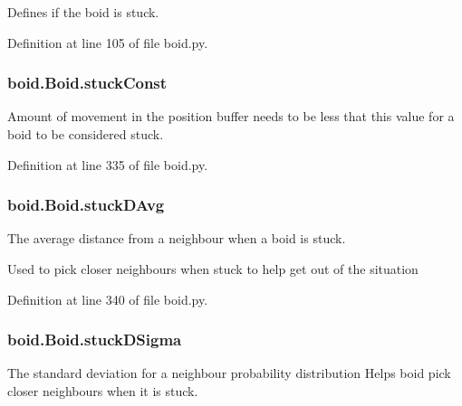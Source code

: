 Defines if the boid is stuck. 



Definition at line 105 of file boid.\-py.

\hypertarget{classboid_1_1Boid_abbcf546137204a45278b6caa95c4378b}{
\subsubsection[{stuck\-Const}]{\setlength{\rightskip}{0pt plus 5cm}boid.\-Boid.\-stuck\-Const}}\label{classboid_1_1Boid_abbcf546137204a45278b6caa95c4378b}


Amount of movement in the position buffer needs to be less that this value for a boid to be considered stuck. 



Definition at line 335 of file boid.\-py.

\hypertarget{classboid_1_1Boid_a663164af1a20323f49e002d7576914f7}{
\subsubsection[{stuck\-D\-Avg}]{\setlength{\rightskip}{0pt plus 5cm}boid.\-Boid.\-stuck\-D\-Avg}}\label{classboid_1_1Boid_a663164af1a20323f49e002d7576914f7}


The average distance from a neighbour when a boid is stuck. 

Used to pick closer neighbours when stuck to help get out of the situation 

Definition at line 340 of file boid.\-py.

\hypertarget{classboid_1_1Boid_a03960faefd59c4a651442eb373aa5c15}{
\subsubsection[{stuck\-D\-Sigma}]{\setlength{\rightskip}{0pt plus 5cm}boid.\-Boid.\-stuck\-D\-Sigma}}\label{classboid_1_1Boid_a03960faefd59c4a651442eb373aa5c15}


The standard deviation for a neighbour probability distribution Helps boid pick closer neighbours when it is stuck. 



